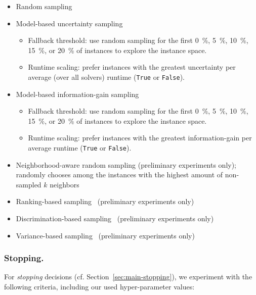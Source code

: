\documentclass[runningheads]{llncs}
\begin{document}
\begin{itemize}
  \item Random sampling 
  \item Model-based uncertainty sampling
  \begin{itemize}
    \item Fallback threshold: use random sampling for the first \SI{0}{\%}, \SI{5}{\%}, \SI{10}{\%}, \SI{15}{\%}, or \SI{20}{\%} of instances to explore the instance space.
    \item Runtime scaling: prefer instances with the greatest uncertainty per average (over all solvers) runtime (\texttt{True} or \texttt{False}).
  \end{itemize}

  \item Model-based information-gain sampling
  \begin{itemize}
    \item Fallback threshold: use random sampling for the first \SI{0}{\%}, \SI{5}{\%}, \SI{10}{\%}, \SI{15}{\%}, or \SI{20}{\%} of instances to explore the instance space.
    \item Runtime scaling: prefer instances with the greatest information-gain per average runtime (\texttt{True} or \texttt{False}).
  \end{itemize}

  \item Neighborhood-aware random sampling (preliminary experiments only); randomly chooses among the instances with the highest amount of non-sampled $k$ neighbors
  \item Ranking-based sampling~\cite{Bossek021a} (preliminary experiments only)
  \item Discrimination-based sampling~\cite{GentHJKMNN14} (preliminary experiments only)
  \item Variance-based sampling~\cite{MatriconAFSH21} (preliminary experiments only)
\end{itemize}

\subsubsection{Stopping.}

For \emph{stopping} decisions (cf. Section~\ref{sec:main-stopping}), we experiment with the following criteria, including our used hyper-parameter values:
\end{document}
